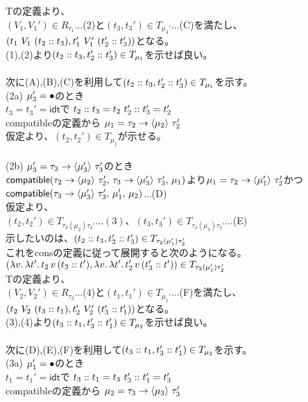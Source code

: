 \documentclass[japanese,draft]{jssst_ppl} %
\begin{document}
Tの定義より、\\
$(V_1,V_1')\in R_{\tau_1}$...(2)と$(t_3,t_3')\in T_{\mu_3'}$...(C)を満たし、$(t_1\ V_1\ (\Cons{t_2}{t_3}),t_1'\ V_1'\ (\Cons{t_2'}{t_3'}))$となる。\\
(1),(2)より$(\Cons{t_2}{t_3},\Cons{t_2'}{t_3'})\in T_{\mu_1}$を示せば良い。\\
\\
次に(A),(B),(C)を利用して$(\Cons{t_2}{t_3},\Cons{t_2'}{t_3'})\in T_{\mu_1}$を示す。\\
(2a) $\mu_3'=\Bullet$のとき\\
$t_3=t_3'=\textsf{idt}$で $\Cons{t_2}{t_3}=t_2\ \Cons{t_2'}{t_3'}=t_2'$\\
\textsf{compatible}の定義から $\mu_1 = \Trail{\tau_2}{\tau_2'}{\mu_2}$\\
仮定より、$(t_2,t_2')\in T_{\mu_1}$が示せる。\\
\\
(2b) $\mu_3'=\Trail{\tau_3}{\tau_3'}{\mu_3'}$のとき\\
$\Compatible{\Trail{\tau_2}{\tau_2'}{\mu_2}}{\Trail{\tau_3}{\tau_3'}{\mu_3'}}{\mu_1}$より$\mu_1 = \Trail{\tau_2}{\tau_2'}{\mu_1'}$かつ$\Compatible{\Trail{\tau_3}{\tau_3'}{\mu_3'}}{\mu_1'}{\mu_2}$...(D)\\
仮定より、\\
$(t_2, t_2')\in T_{\tau_2(\mu_2)\tau_2'}...(3)、(t_3, t_3')\in T_{\tau_3(\mu_3)\tau_3'}$...(E)\\
示したいのは、$(\Cons{t_2}{t_3}, \Cons{t_2'}{t_3'})\in T_{\tau_2(\mu_1')\tau_2'}$\\これを\textsf{cons}の定義に従って展開すると次のようになる。\\
$(\Lam{v}{\Lam{t'}{t_2\,v\,(\Cons{t_3}{t'})}}, \Lam{v}{\Lam{t'}{t_2'\,v\,(\Cons{t_3'}{t'})}})\in T_{\tau_2(\mu_1')\tau_2'}$\\
Tの定義より、\\
$(V_2,V_2')\in R_{\tau_2}$...(4)と$(t_1,t_1')\in T_{\mu_1'}$...(F)を満たし、$(t_2\ V_2\ (\Cons{t_3}{t_1}),t_2'\ V_2'\ (\Cons{t_3'}{t_1'}))$となる。\\
(3),(4)より$(\Cons{t_3}{t_1},\Cons{t_3'}{t_1'})\in T_{\mu_2}$を示せば良い。\\
\\
次に(D),(E),(F)を利用して$(\Cons{t_3}{t_1},\Cons{t_3'}{t_1'})\in T_{\mu_2}$を示す。\\
(3a) $\mu_1'=\Bullet$のとき\\
$t_1=t_1'=\textsf{idt}$で $\Cons{t_3}{t_1}=t_3\ \Cons{t_3'}{t_1'}=t_3'$\\
\textsf{compatible}の定義から $\mu_2 = \Trail{\tau_3}{\tau_3'}{\mu_3}$\\
\end{document}
